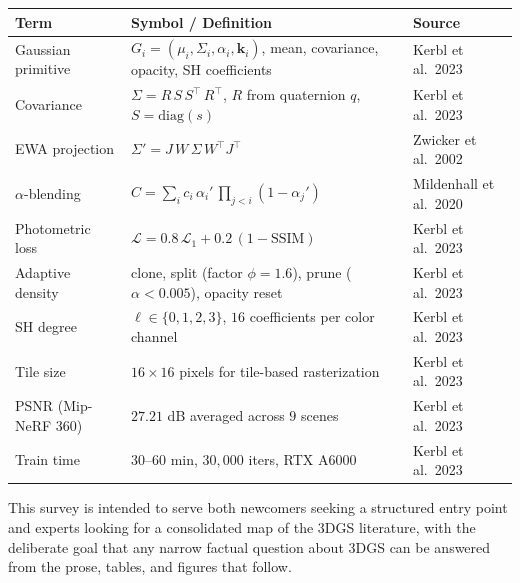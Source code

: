 {\def\LTcaptype{none} %
\begin{longtable}[]{@{}
  >{\raggedright\arraybackslash}p{}
  >{\raggedright\arraybackslash}p{}
  >{\raggedright\arraybackslash}p{}@{}}
\toprule\noalign{}
\begin{minipage}[b]{\linewidth}\raggedright
\textbf{Term}
\end{minipage} & \begin{minipage}[b]{\linewidth}\raggedright
\textbf{Symbol / Definition}
\end{minipage} & \begin{minipage}[b]{\linewidth}\raggedright
\textbf{Source}
\end{minipage} \\
\midrule\noalign{}
\endhead
\bottomrule\noalign{}
\endlastfoot
Gaussian primitive & \(G_i=(\mu_i,\Sigma_i,\alpha_i,\mathbf{k}_i)\), mean, covariance, opacity, SH coefficients & Kerbl et al.~2023 \\
Covariance & \(\Sigma = R\,S\,S^{\top}\,R^{\top}\), \(R\) from quaternion \(q\), \(S=\mathrm{diag}(s)\) & Kerbl et al.~2023 \\
EWA projection & \(\Sigma' = J\,W\,\Sigma\,W^{\top}J^{\top}\) & Zwicker et al.~2002 \\
\(\alpha\)-blending & \(C=\sum_i c_i\,\alpha_i'\,\prod_{j<i}(1-\alpha_j')\) & Mildenhall et al.~2020 \\
Photometric loss & \(\mathcal{L}=0.8\,\mathcal{L}_1+0.2\,(1-\mathrm{SSIM})\) & Kerbl et al.~2023 \\
Adaptive density & clone, split (factor \(\phi=1.6\)), prune (\(\alpha<0.005\)), opacity reset & Kerbl et al.~2023 \\
SH degree & \(\ell\in\{0,1,2,3\}\), \(16\) coefficients per color channel & Kerbl et al.~2023 \\
Tile size & \(16\times16\) pixels for tile-based rasterization & Kerbl et al.~2023 \\
PSNR (Mip-NeRF 360) & \(27.21\) dB averaged across \(9\) scenes & Kerbl et al.~2023 \\
Train time & \(30\)--\(60\) min, \(30{,}000\) iters, RTX A6000 & Kerbl et al.~2023 \\
\end{longtable}
}

This survey is intended to serve both newcomers seeking a structured entry point and experts looking for a consolidated map of the 3DGS literature, with the deliberate goal that any narrow factual question about 3DGS can be answered from the prose, tables, and figures that follow.

